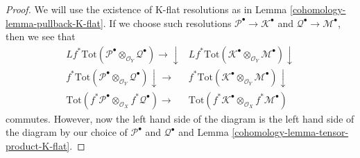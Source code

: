 \begin{proof}

We will use the existence of K-flat resolutions as in
Lemma \ref{cohomology-lemma-pullback-K-flat}. If we choose such
resolutions $\mathcal{P}^\bullet \to \mathcal{K}^\bullet$
and $\mathcal{Q}^\bullet \to \mathcal{M}^\bullet$, then
we see that
$$
\begin{array}{cc}Lf^*\text{Tot}(\mathcal{P}^\bullet
\otimes_{\mathcal{O}_Y}
\mathcal{Q}^\bullet) \longrightarrow\downarrow & Lf^*\text{Tot}(\mathcal{K}^\bullet
\otimes_{\mathcal{O}_Y}
\mathcal{M}^\bullet) \downarrow \\ f^*\text{Tot}(\mathcal{P}^\bullet
\otimes_{\mathcal{O}_Y}
\mathcal{Q}^\bullet) \downarrow\longrightarrow & f^*\text{Tot}(\mathcal{K}^\bullet
\otimes_{\mathcal{O}_Y}
\mathcal{M}^\bullet) \downarrow \\ \text{Tot}(f^*\mathcal{P}^\bullet \otimes_{\mathcal{O}_X}
f^*\mathcal{Q}^\bullet) \longrightarrow & \text{Tot}(f^*\mathcal{K}^\bullet \otimes_{\mathcal{O}_X}
f^*\mathcal{M}^\bullet)\end{array}
$$
commutes. However, now the left hand side of the diagram
is the left hand side of the diagram by our choice of
$\mathcal{P}^\bullet$ and $\mathcal{Q}^\bullet$ and
Lemma \ref{cohomology-lemma-tensor-product-K-flat}.
\end{proof}

